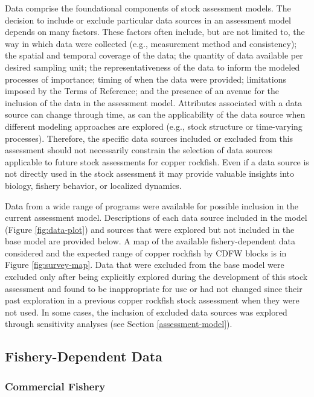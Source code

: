 \documentclass[11pt,
  english,
  letterpaper,
]{article}
\begin{document}
Data comprise the foundational components of stock assessment models. The decision to include or exclude particular data sources in an assessment model depends on many factors. These factors often include, but are not limited to, the way in which data were collected (e.g., measurement method and consistency); the spatial and temporal coverage of the data; the quantity of data available per desired sampling unit; the representativeness of the data to inform the modeled processes of importance; timing of when the data were provided; limitations imposed by the Terms of Reference; and the presence of an avenue for the inclusion of the data in the assessment model. Attributes associated with a data source can change through time, as can the applicability of the data source when different modeling approaches are explored (e.g., stock structure or time-varying processes). Therefore, the specific data sources included or excluded from this assessment should not necessarily constrain the selection of data sources applicable to future stock assessments for copper rockfish. Even if a data source is not directly used in the stock assessment it may provide valuable insights into biology, fishery behavior, or localized dynamics.

Data from a wide range of programs were available for possible inclusion in the current assessment model. Descriptions of each data source included in the model (Figure \ref{fig:data-plot}) and sources that were explored but not included in the base model are provided below. A map of the available fishery-dependent data considered and the expected range of copper rockfish by CDFW blocks is in Figure \ref{fig:survey-map}. Data that were excluded from the base model were excluded only after being explicitly explored during the development of this stock assessment and found to be inappropriate for use or had not changed since their past exploration in a previous copper rockfish stock assessment when they were not used. In some cases, the inclusion of excluded data sources was explored through sensitivity analyses (see Section \ref{assessment-model}).

\hypertarget{fishery-dependent-data}{%
\subsection{Fishery-Dependent Data}\label{fishery-dependent-data}}

\hypertarget{commercial-fishery}{%
\subsubsection{Commercial Fishery}\label{commercial-fishery}}
\end{document}
